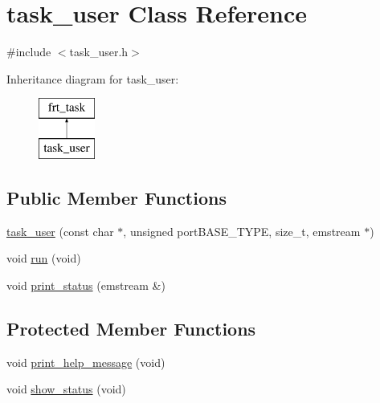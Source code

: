 \hypertarget{classtask__user}{\section{task\+\_\+user Class Reference}
\label{classtask__user}
}


{\ttfamily \#include $<$task\+\_\+user.\+h$>$}

Inheritance diagram for task\+\_\+user\+:\begin{figure}[H]
\begin{center}
\leavevmode
\includegraphics[height=2.000000cm]{classtask__user}
\end{center}
\end{figure}
\subsection*{Public Member Functions}
\begin{DoxyCompactItemize}
\item 
\hyperlink{classtask__user_a3aba77563b375bb14838800608da48bc}{task\+\_\+user} (const char $\ast$, unsigned port\+B\+A\+S\+E\+\_\+\+T\+Y\+P\+E, size\+\_\+t, emstream $\ast$)
\item 
void \hyperlink{classtask__user_adca6429d57be25e8d411414fc8ad75af}{run} (void)
\item 
void \hyperlink{classtask__user_a78170e5ebe8dca1ce0a5a09c507399f1}{print\+\_\+status} (emstream \&)
\end{DoxyCompactItemize}
\subsection*{Protected Member Functions}
\begin{DoxyCompactItemize}
\item 
void \hyperlink{classtask__user_a75475060f83bae1e44bcc8a5c34015c7}{print\+\_\+help\+\_\+message} (void)
\item 
void \hyperlink{classtask__user_a105bebbd9cb1031154c3dfc3662db4a0}{show\+\_\+status} (void)
\end{DoxyCompactItemize}
